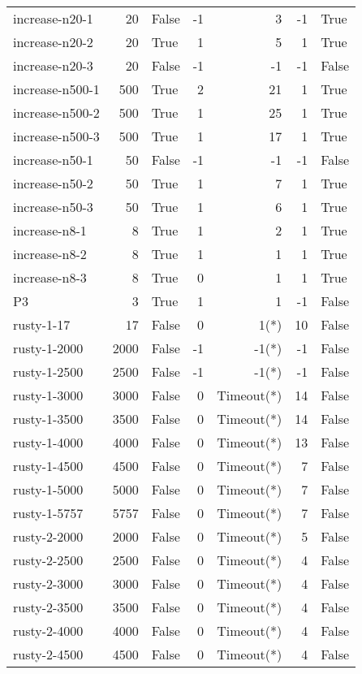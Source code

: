 \begin{longtable}{lrlrrrl}
increase-n20-1 & 20 & False & -1 & 3 & -1 & True \\
increase-n20-2 & 20 & True & 1 & 5 & 1 & True \\
increase-n20-3 & 20 & False & -1 & -1 & -1 & False \\
increase-n500-1 & 500 & True & 2 & 21 & 1 & True \\
increase-n500-2 & 500 & True & 1 & 25 & 1 & True \\
increase-n500-3 & 500 & True & 1 & 17 & 1 & True \\
increase-n50-1 & 50 & False & -1 & -1 & -1 & False \\
increase-n50-2 & 50 & True & 1 & 7 & 1 & True \\
increase-n50-3 & 50 & True & 1 & 6 & 1 & True \\
increase-n8-1 & 8 & True & 1 & 2 & 1 & True \\
increase-n8-2 & 8 & True & 1 & 1 & 1 & True \\
increase-n8-3 & 8 & True & 0 & 1 & 1 & True \\
P3 & 3 & True & 1 & 1 & -1 & False \\
rusty-1-17 & 17 & False & 0 & 1(*) & 10 & False \\
rusty-1-2000 & 2000 & False & -1 & -1(*) & -1 & False \\
rusty-1-2500 & 2500 & False & -1 & -1(*) & -1 & False \\
rusty-1-3000 & 3000 & False & 0 & Timeout(*) & 14 & False \\
rusty-1-3500 & 3500 & False & 0 & Timeout(*) & 14 & False \\
rusty-1-4000 & 4000 & False & 0 & Timeout(*) & 13 & False \\
rusty-1-4500 & 4500 & False & 0 & Timeout(*) & 7 & False \\
rusty-1-5000 & 5000 & False & 0 & Timeout(*) & 7 & False \\
rusty-1-5757 & 5757 & False & 0 & Timeout(*) & 7 & False \\
rusty-2-2000 & 2000 & False & 0 & Timeout(*) & 5 & False \\
rusty-2-2500 & 2500 & False & 0 & Timeout(*) & 4 & False \\
rusty-2-3000 & 3000 & False & 0 & Timeout(*) & 4 & False \\
rusty-2-3500 & 3500 & False & 0 & Timeout(*) & 4 & False \\
rusty-2-4000 & 4000 & False & 0 & Timeout(*) & 4 & False \\
rusty-2-4500 & 4500 & False & 0 & Timeout(*) & 4 & False \\

\end{longtable}
